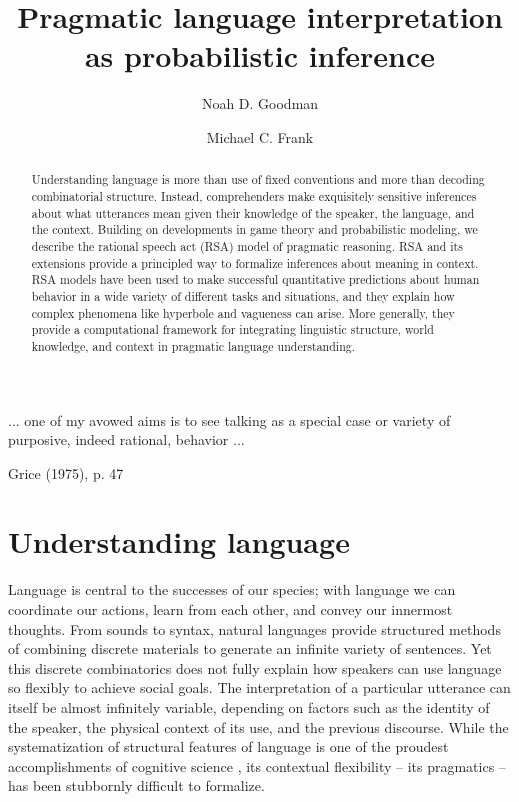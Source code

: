 \documentclass[]{elsarticle}
\title{Pragmatic language interpretation as probabilistic inference}
\author[stan]{Noah D. Goodman\corref{cor1}}
\author[stan]{Michael C. Frank}
\begin{document}
\begin{abstract}
Understanding language is more than use of fixed conventions and more than decoding combinatorial structure. Instead, comprehenders make exquisitely sensitive inferences about what utterances mean given their knowledge of the speaker, the language, and the context.
Building on developments in game theory and probabilistic modeling, we describe the rational speech act (RSA) model of pragmatic reasoning. RSA and its extensions provide a principled way to formalize inferences about meaning in context. RSA models have been used to make successful quantitative predictions about human behavior in a wide variety of different tasks and situations, and they explain how complex phenomena like hyperbole and vagueness can arise. More generally, they provide a computational framework for integrating linguistic structure, world knowledge, and context in pragmatic language understanding.
\end{abstract}

\maketitle

\epigraph{... one of my avowed aims is to see talking as a special case or
variety of purposive, indeed rational, behavior ...}{Grice (1975),
p. 47}

\section{Understanding language}
\label{introduction}

Language is central to the successes of our species; with language we
can coordinate our actions, learn from each other, and convey our
innermost thoughts. From sounds to syntax, natural languages provide
structured methods of combining discrete materials to generate an
infinite variety of sentences. Yet this discrete combinatorics does not
fully explain how speakers can use language so flexibly to achieve
social goals. The interpretation of a particular utterance
can itself be almost infinitely variable, depending on factors such as
the identity of the speaker, the physical context of its use, and the
previous discourse. While the systematization of structural features of
language is one of the proudest accomplishments of cognitive science \citep[e.g.,][]{chomsky1965,jackendoff2002,goldberg2003}, its contextual
flexibility -- its pragmatics -- has been stubbornly difficult to
formalize.
\end{document}
